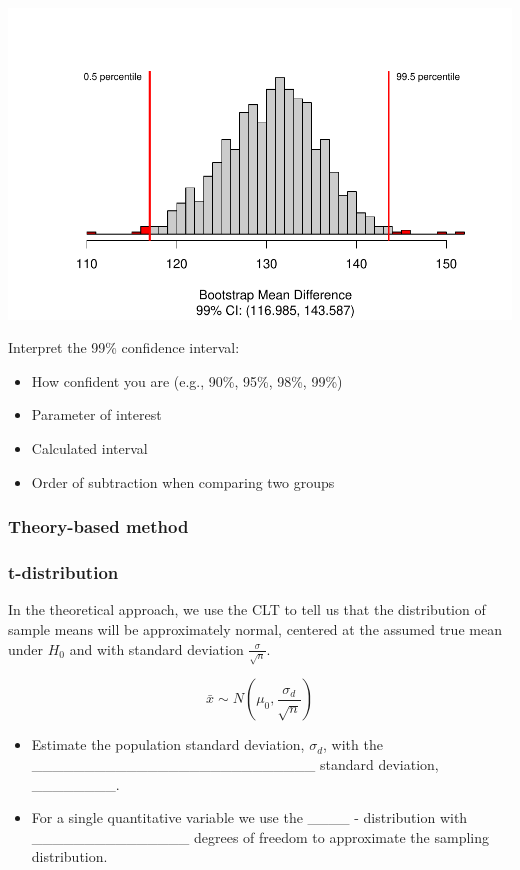 \documentclass[
]{report}
\begin{document}
\begin{center}\includegraphics[width=0.7\linewidth]{11-LN011-paired_files/figure-latex/unnamed-chunk-6-1} \end{center}

Interpret the 99\% confidence interval:

\begin{itemize}
\item
  How confident you are (e.g., 90\%, 95\%, 98\%, 99\%)
\item
  Parameter of interest
\item
  Calculated interval
\item
  Order of subtraction when comparing two groups
\end{itemize}

\vspace{0.8in}

\hypertarget{theory-based-method-1}{%
\subsubsection*{Theory-based method}\label{theory-based-method-1}}

\hypertarget{t-distribution}{%
\subsubsection*{t-distribution}\label{t-distribution}}

In the theoretical approach, we use the CLT to tell us that the distribution of sample means will be approximately normal, centered at the assumed true mean under \(H_0\) and with standard deviation \(\frac{\sigma}{\sqrt{n}}\).

\[\bar{x} \sim N(\mu_0, \frac{\sigma_d}{\sqrt{n}})\]

\begin{itemize}
\item
  Estimate the population standard deviation, \(\sigma_d\), with the
  \_\_\_\_\_\_\_\_\_\_\_\_\_\_\_\_\_\_\_\_\_\_\_\_\_\_\_ standard deviation, \_\_\_\_\_\_\_\_.
\item
  For a single quantitative variable we use the \_\_\_\_ - distribution
  with \_\_\_\_\_\_\_\_\_\_\_\_\_\_\_
  degrees of freedom to approximate the sampling distribution.
\end{itemize}
\end{document}
